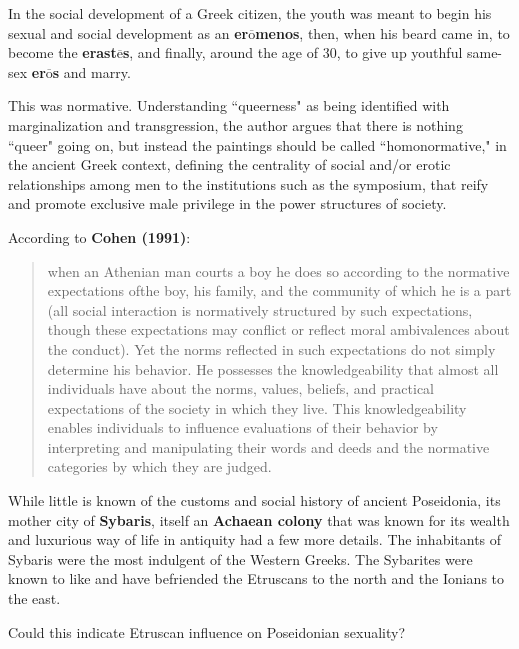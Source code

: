 \begin{rmk}
    In the social development of a Greek citizen, the youth was meant to begin his sexual and social development as an \textbf{er$\overline{\text{o}}$menos}, then, when his beard came in, to become the \textbf{erast$\overline{\text{e}}$s}, and finally, around the age of $30$, to give up youthful same-sex \textbf{er$\overline{\text{o}}$s} and marry.
\end{rmk}

This was normative. Understanding ``queerness" as being identified with marginalization and transgression, the author argues that there is nothing ``queer" going on, but instead the paintings should be called ``homonormative," in the ancient Greek context, defining the centrality of social and/or erotic relationships among men to the institutions such as the symposium, that reify and promote exclusive male privilege in the power structures of society.

According to \textbf{Cohen (1991)}:
\begin{quotation}
    when an Athenian man courts a boy he does so according to the normative expectations ofthe boy, his family, and the community of which he is a part (all social interaction is normatively structured by such expectations, though these expectations may conflict or reflect moral ambivalences about the conduct). Yet the norms reflected in such expectations do not simply determine his behavior. He possesses the knowledgeability that almost all individuals have about the norms, values, beliefs, and practical expectations of the society in which they live. This knowledgeability enables individuals to influence evaluations of their behavior by interpreting and manipulating their words and deeds and the normative categories by which they are judged.
\end{quotation}

While little is known of the customs and social history of ancient Poseidonia, its mother city of \textbf{Sybaris}, itself an \textbf{Achaean colony} that was known for its wealth and luxurious way of life in antiquity had a few more details. The inhabitants of Sybaris were the most indulgent of the Western Greeks. The Sybarites were known to like and have befriended the Etruscans to the north and the Ionians to the east. 

\begin{qst}
    Could this indicate Etruscan influence on Poseidonian sexuality? 
\end{qst}

